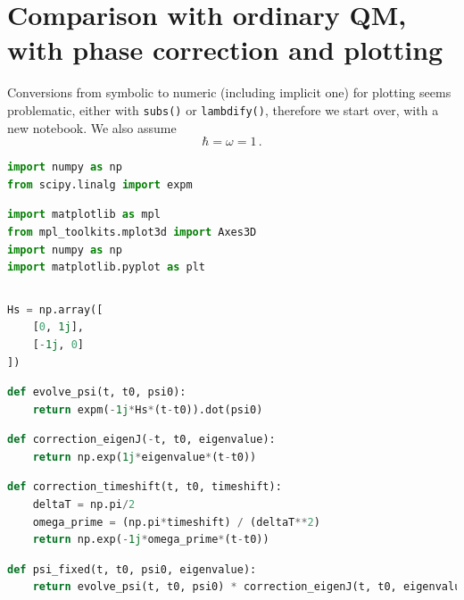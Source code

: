 \hypertarget{nb:moreva-vs-qm}{%
\section{Comparison with ordinary
QM, with phase correction and plotting}\label{nb:moreva-vs-qm}}

Conversions from symbolic to numeric (including implicit one) for
plotting seems problematic, either with \verb#subs()#
or \verb#lambdify()#, therefore we start over, with a
new notebook. We also assume \begin{equation*}
    \hbar = \omega = 1 \,\text{.}
\end{equation*}

\begin{lstlisting}[language=Python]
import numpy as np
from scipy.linalg import expm
\end{lstlisting}

\begin{lstlisting}[language=Python]
import matplotlib as mpl
from mpl_toolkits.mplot3d import Axes3D
import numpy as np
import matplotlib.pyplot as plt
\end{lstlisting}

\begin{lstlisting}[language=Python]
%matplotlib inline
\end{lstlisting}

\begin{lstlisting}[language=Python]
Hs = np.array([
    [0, 1j],
    [-1j, 0]
])
\end{lstlisting}

\begin{lstlisting}[language=Python]
def evolve_psi(t, t0, psi0):
    return expm(-1j*Hs*(t-t0)).dot(psi0)
\end{lstlisting}

\begin{lstlisting}[language=Python]
def correction_eigenJ(-t, t0, eigenvalue):
    return np.exp(1j*eigenvalue*(t-t0))
\end{lstlisting}

\begin{lstlisting}[language=Python]
def correction_timeshift(t, t0, timeshift):
    deltaT = np.pi/2
    omega_prime = (np.pi*timeshift) / (deltaT**2)
    return np.exp(-1j*omega_prime*(t-t0))
\end{lstlisting}

\begin{lstlisting}[language=Python]
def psi_fixed(t, t0, psi0, eigenvalue):
    return evolve_psi(t, t0, psi0) * correction_eigenJ(t, t0, eigenvalue) * correction_timeshift(t, t0, t0)
\end{lstlisting}

